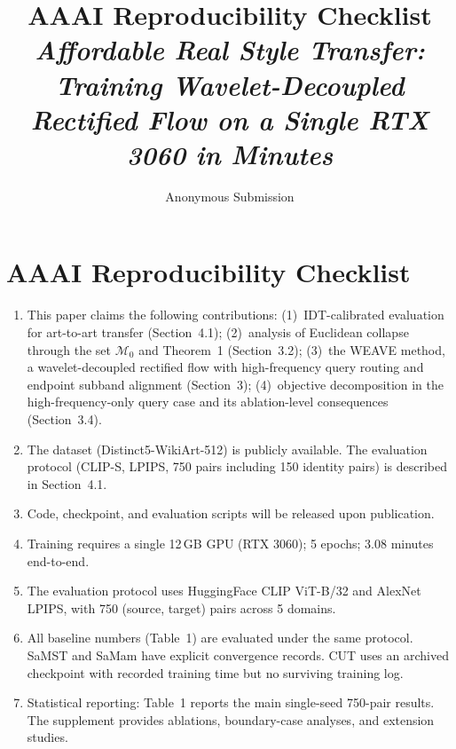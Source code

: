 \documentclass[letterpaper]{article}
\title{AAAI Reproducibility Checklist\\[4pt]
\large \textit{Affordable Real Style Transfer: Training Wavelet-Decoupled Rectified Flow on a Single RTX 3060 in Minutes}}
\author{Anonymous Submission}
\begin{document}
\maketitle

\section*{AAAI Reproducibility Checklist}

\begin{enumerate}
\item This paper claims the following contributions:
(1)~IDT-calibrated evaluation for art-to-art transfer (Section~4.1);
(2)~analysis of Euclidean collapse through the set $\mathcal{M}_0$ and Theorem~1 (Section~3.2);
(3)~the WEAVE method, a wavelet-decoupled rectified flow with high-frequency query routing and endpoint subband alignment (Section~3);
(4)~objective decomposition in the high-frequency-only query case and its ablation-level consequences (Section~3.4).
\item The dataset (Distinct5-WikiArt-512) is publicly available. The evaluation protocol (CLIP-S, LPIPS, 750 pairs including 150 identity pairs) is described in Section~4.1.
\item Code, checkpoint, and evaluation scripts will be released upon publication.
\item Training requires a single 12\,GB GPU (RTX 3060); 5 epochs; 3.08 minutes end-to-end.
\item The evaluation protocol uses HuggingFace CLIP ViT-B/32 and AlexNet LPIPS, with 750 (source, target) pairs across 5 domains.
\item All baseline numbers (Table~1) are evaluated under the same protocol.
SaMST and SaMam have explicit convergence records.
CUT uses an archived checkpoint with recorded training time but no surviving training log.
\item Statistical reporting: Table~1 reports the main single-seed 750-pair results.
The supplement provides ablations, boundary-case analyses, and extension studies.
\end{enumerate}
\end{document}

